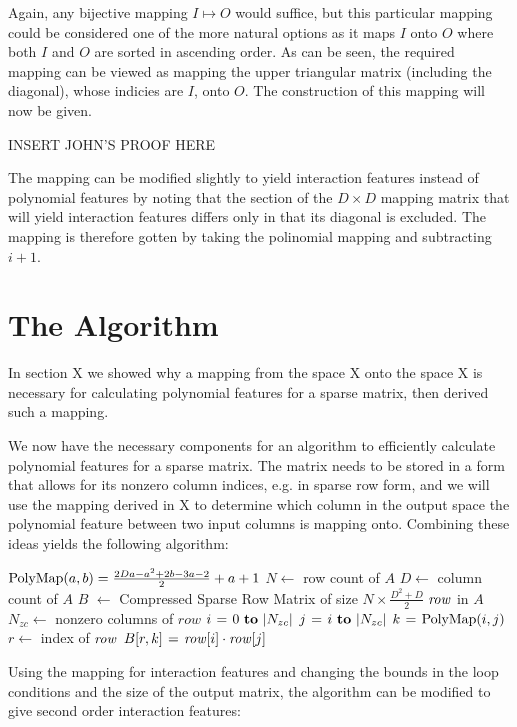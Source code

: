 \documentclass[11pt,onecolumn]{article}
\begin{document}
Again, any bijective mapping $I \mapsto O$ would suffice, but this particular mapping could
be considered one of the more natural options as it maps $I$ onto $O$ where both $I$ and $O$ are sorted in ascending order.
As can be seen, the required mapping can be viewed as mapping the upper triangular matrix (including 
the diagonal), whose indicies are $I$, onto $O$. The construction of this mapping will now
be given.

INSERT JOHN'S PROOF HERE

The mapping can be modified slightly to yield interaction features instead of polynomial features
by noting that the section of the $D \times D$ mapping matrix that will yield interaction
features differs only in that its diagonal is excluded. The mapping is therefore gotten by
taking the polinomial mapping and subtracting $i+1$.


\section{The Algorithm}
In section X we showed why a mapping from the space X
onto the space X is necessary for calculating polynomial features for a sparse matrix, then
derived such a mapping.

We now have the necessary components for an algorithm to efficiently calculate polynomial features for
a sparse matrix. The matrix needs to be stored in a form that allows for its nonzero column indices, e.g. in sparse row form,
and we will use the mapping derived in X to determine which column in the output space
the polynomial feature between two input columns is mapping onto. Combining these ideas yields the following algorithm:

\begin{codebox}
    \zi $\func{PolyMap}(a, b) = \frac{2Da-a^2+2b-3a-2}{2}+a+1$
    \zi $N \gets$ row count of $A$
    \zi $D \gets$ column count of $A$
    \zi $B$ $\gets$ Compressed Sparse Row Matrix of size $N \times \frac{D^2+D}{2}$
    \zi \For $\id{row}$ in $A$ \Do
    \zi     $N_{zc} \gets$ nonzero columns of $row$
    \zi     \For $i \gets 0 \To |N_{zc}|$ \Do
    \zi         \For $j \gets i \To |N_{zc}|$ \Do
    \zi             $k \gets \func{PolyMap}(i, j)$
    \zi             $r \gets$ index of $\id{row}$
    \zi             $B[r, k] \gets \id{row}[i] \cdot \id{row}[j]$
                \End
            \End
       	\End
\end{codebox}

Using the mapping for interaction features and changing the bounds in the loop conditions and the size of the output matrix, 
the algorithm can be modified to give second order interaction features:
\end{document}
